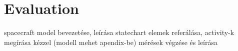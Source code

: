 \chapter{Evaluation}\label{ch:evaluation}

spacecraft model bevezetése, leírása
statechart elemek referálása, activity-k megírása kézzel (modell mehet apendix-be)
mérések végzése és leírása
